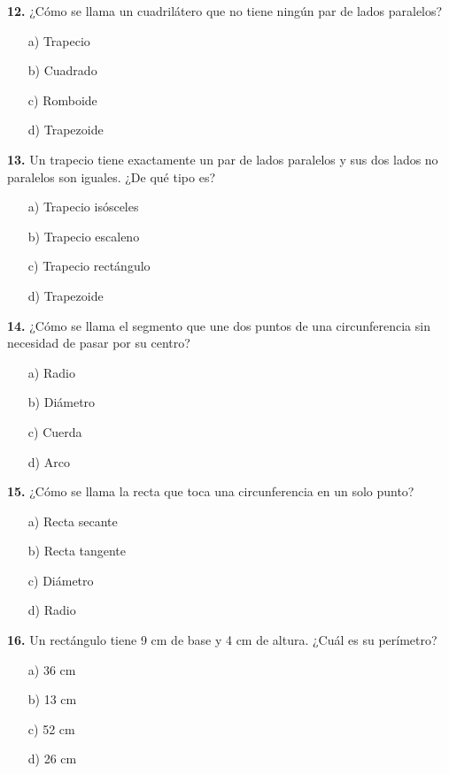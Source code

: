 \noindent\textbf{12.} ¿Cómo se llama un cuadrilátero que no tiene ningún par de lados paralelos?

\begin{itemize}
    \item[a)] Trapecio
    \item[b)] Cuadrado
    \item[c)] Romboide
    \item[d)] Trapezoide
\end{itemize}


\noindent\textbf{13.} Un trapecio tiene exactamente un par de lados paralelos y sus dos lados no paralelos son iguales. ¿De qué tipo es?

\begin{itemize}
    \item[a)] Trapecio isósceles
    \item[b)] Trapecio escaleno
    \item[c)] Trapecio rectángulo
    \item[d)] Trapezoide
\end{itemize}


\noindent\textbf{14.} ¿Cómo se llama el segmento que une dos puntos de una circunferencia sin necesidad de pasar por su centro?

\begin{itemize}
    \item[a)] Radio
    \item[b)] Diámetro
    \item[c)] Cuerda
    \item[d)] Arco
\end{itemize}


\noindent\textbf{15.} ¿Cómo se llama la recta que toca una circunferencia en un solo punto?

\begin{itemize}
    \item[a)] Recta secante
    \item[b)] Recta tangente
    \item[c)] Diámetro
    \item[d)] Radio
\end{itemize}


\noindent\textbf{16.} Un rectángulo tiene 9 cm de base y 4 cm de altura. ¿Cuál es su perímetro?

\begin{itemize}
    \item[a)] 36 cm
    \item[b)] 13 cm
    \item[c)] 52 cm
    \item[d)] 26 cm
\end{itemize}


